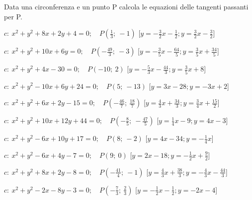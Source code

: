 \begin{esercizio}\label{ese:}
 Data una circonferenza e un punto P calcola le equazioni delle tangenti 
passanti per P.
 \begin{enumeratea}
  \item  \(c:~x^2 + y^2 +8x +2y +4 = 0; \quad P \left (\frac{1}{3};~-1 
\right )\)
   \hfill [\(y = -\frac{3}{2} x -\frac{1}{2}; y = \frac{3}{2} x 
-\frac{3}{2}\)]
  \item  \(c:~x^2 + y^2 +10x +6y  = 0; \quad P \left (-\frac{49}{3};~-3 
\right )\)
   \hfill [\(y = -\frac{3}{5} x -\frac{64}{5}; y = \frac{3}{5} x 
+\frac{34}{5}\)]
  \item  \(c:~x^2 + y^2 +4x -30 = 0; \quad P \left (-10;~2 \right )\)
   \hfill [\(y = -\frac{5}{3} x -\frac{44}{3}; y = \frac{3}{5} x +8\)]
  \item  \(c:~x^2 + y^2 -10x +6y +24 = 0; \quad P \left (5;~-13 \right )\)
   \hfill [\(y = 3 x -28; y = -3 x +2\)]
  \item  \(c:~x^2 + y^2 +6x +2y -15 = 0; \quad P \left 
(-\frac{46}{7};~\frac{18}{7} 
\right )\)
   \hfill [\(y = \frac{4}{3} x +\frac{34}{3}; y = \frac{3}{4} x 
+\frac{15}{2}\)]
  \item  \(c:~x^2 + y^2 +10x +12y +44 = 0; \quad P \left 
(-\frac{8}{5};~-\frac{47}{5} \right )\)
   \hfill [\(y = \frac{1}{4} x -9; y = 4 x -3\)]
  \item  \(c:~x^2 + y^2 -6x +10y +17 = 0; \quad P \left (8;~-2 \right )\)
   \hfill [\(y = 4 x -34; y = -\frac{1}{4} x \)]
  \item  \(c:~x^2 + y^2 -6x +4y -7 = 0; \quad P \left (9;~0 \right )\)
   \hfill [\(y = 2 x -18; y = -\frac{1}{2} x +\frac{9}{2}\)]
  \item  \(c:~x^2 + y^2 +8x +2y -8 = 0; \quad P \left (-\frac{41}{4};~-1 
\right )\)
   \hfill [\(y = \frac{4}{3} x +\frac{38}{3}; y = -\frac{4}{3} x 
-\frac{44}{3}\)]
  \item  \(c:~x^2 + y^2 -2x -8y -3 = 0; \quad P \left 
(-\frac{7}{3};~\frac{2}{3} 
\right )\)
   \hfill [\(y = -\frac{1}{2} x -\frac{1}{2}; y = -2 x -4\)]
 \end{enumeratea}
\end{esercizio}

